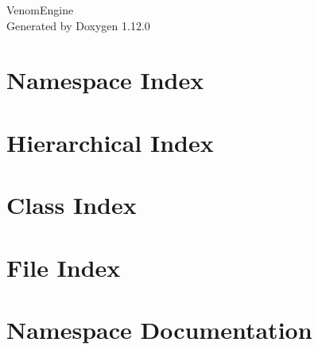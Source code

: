 \documentclass[twoside]{book}
\newcommand{\+}{\discretionary{\mbox{\scriptsize$\hookleftarrow$}}{}{}}
\newcommand{\clearemptydoublepage}{%
    \newpage{\pagestyle{empty}\cleardoublepage}%
  }
\begin{document}
  \raggedbottom
    \hypersetup{pageanchor=false,
                bookmarksnumbered=true,
                pdfencoding=unicode
               }
  \begin{titlepage}
  \vspace*{7cm}
  \begin{center}%
  {\Large Venom\+Engine}\\
  \vspace*{1cm}
  {\large Generated by Doxygen 1.12.0}\\
  \end{center}
  \end{titlepage}
  \clearemptydoublepage
  \tableofcontents
  \clearemptydoublepage
  \hypersetup{pageanchor=true}







\chapter{Namespace Index}

\chapter{Hierarchical Index}

\chapter{Class Index}

\chapter{File Index}

\chapter{Namespace Documentation}



\end{document}
